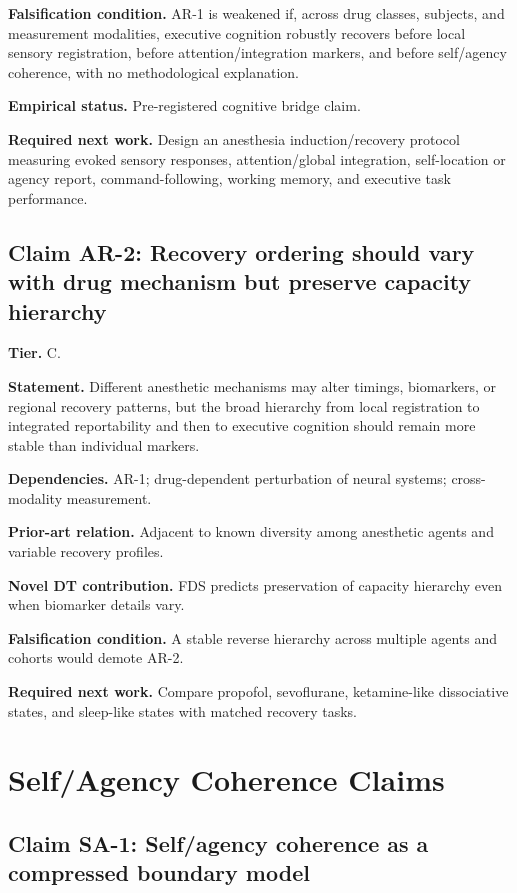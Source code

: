 \documentclass[10pt,a4paper,twocolumn,aps,prl]{revtex4-2}
\theoremstyle{claimstyle}
\theoremstyle{definition}
\newcommand{\FDS}{FDS}
\newcommand{\claimfield}[1]{\noindent\textbf{#1.}}
\begin{document}
\claimfield{Falsification condition} AR-1 is weakened if, across drug classes, subjects, and measurement modalities, executive cognition robustly recovers before local sensory registration, before attention/integration markers, and before self/agency coherence, with no methodological explanation.

\claimfield{Empirical status} Pre-registered cognitive bridge claim.

\claimfield{Required next work} Design an anesthesia induction/recovery protocol measuring evoked sensory responses, attention/global integration, self-location or agency report, command-following, working memory, and executive task performance.

\subsection{Claim AR-2: Recovery ordering should vary with drug mechanism but preserve capacity hierarchy}

\claimfield{Tier} C.

\claimfield{Statement} Different anesthetic mechanisms may alter timings, biomarkers, or regional recovery patterns, but the broad hierarchy from local registration to integrated reportability and then to executive cognition should remain more stable than individual markers.

\claimfield{Dependencies} AR-1; drug-dependent perturbation of neural systems; cross-modality measurement.

\claimfield{Prior-art relation} Adjacent to known diversity among anesthetic agents and variable recovery profiles.

\claimfield{Novel DT contribution} \FDS{} predicts preservation of capacity hierarchy even when biomarker details vary.

\claimfield{Falsification condition} A stable reverse hierarchy across multiple agents and cohorts would demote AR-2.

\claimfield{Required next work} Compare propofol, sevoflurane, ketamine-like dissociative states, and sleep-like states with matched recovery tasks.

\section{Self/Agency Coherence Claims}

\subsection{Claim SA-1: Self/agency coherence as a compressed boundary model}
\end{document}
